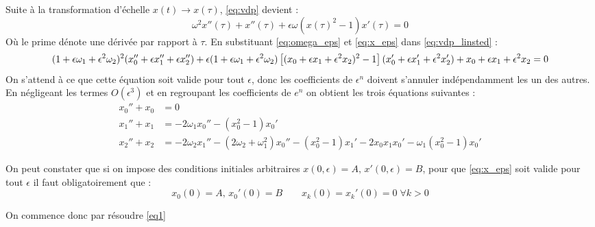 Suite à la transformation d'échelle $x(t) \to x(\tau)$, \eqref{eq:vdp} devient :
\begin{equation}
    \omega^2x''(\tau) + x''(\tau) + \epsilon\omega \left( x(\tau)^2 - 1 \right)x'(\tau) = 0
    \label{eq:vdp_linsted}
\end{equation}
Où le prime dénote une dérivée par rapport à $\tau$. En substituant \eqref{eq:omega_eps} et \eqref{eq:x_eps} dans \eqref{eq:vdp_linsted} :
\begin{dmath}
    (1+\epsilon\omega_1 + \epsilon^2\omega_2)^2(x_0'' + \epsilon x_1'' + \epsilon x_2'') + \epsilon(1+\epsilon\omega_1 + \epsilon^2\omega_2)\left[(x_0 + \epsilon x_1 + \epsilon^2 x_2)^2-1\right](x_0' + \epsilon x_1' + \epsilon^2 x_2') \\
    + {x_0 + \epsilon x_1 + \epsilon^2 x_2} = 0
\end{dmath}
On s’attend à ce que cette  équation soit valide pour tout $\epsilon$, donc les coefficients de $\epsilon^n$ doivent s’annuler indépendamment les un des autres. En négligeant les termes $O(\epsilon^3)$ et en regroupant les coefficients de $e^n$ on obtient les trois équations suivantes :
\begin{align}
    \label{eq:O_1}
    x_0'' + x_0 &= 0  \\
    \label{eq:O_eps}
    x_1'' + x_1 &= -2\omega_1 x_0'' - (x_0^2 - 1)x_0' \\
    \label{eq:O_eps2}
    x_2'' + x_2 &= -2\omega_2 x_1'' - (2\omega_2 + \omega_1^2)x_0'' - (x_0^2 - 1)x_1' - 2x_0 x_1 x_0' - \omega_1(x_0^2 - 1)x_0'
\end{align}


On peut constater que si on impose des conditions initiales arbitraires $x(0, \epsilon)=A,  \, x'(0, \epsilon)=B$, pour que \eqref{eq:x_eps} soit valide pour tout $\epsilon$ il faut obligatoirement que :
\begin{equation}
    x_0(0) = A,\, x_0'(0) = B
    \qquad
    x_k(0) = x_k'(0) = 0 \; \forall k > 0
\end{equation}

On commence donc par résoudre \eqref{eq1}